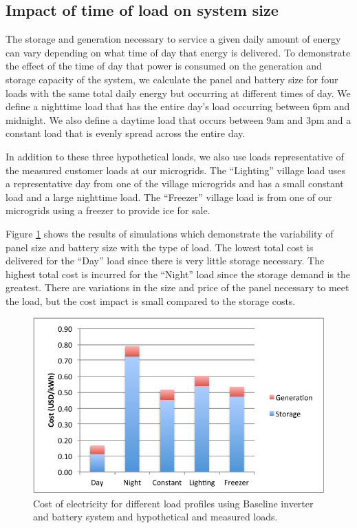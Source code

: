 \documentclass[conference]{IEEEtran}
\begin{document}
\subsection{Impact of time of load on system size}

The storage and generation necessary to service a given daily
amount of energy can vary depending on what time of day
that energy is delivered.
To demonstrate the effect of the time of day that power
is consumed on the generation and storage capacity of the system,
we calculate the panel and battery size for four loads with
the same total daily energy but occurring at different times of day.
We define a nighttime load that has the entire day's load 
occurring between 6pm and midnight.
We also define a daytime load that occurs between 9am and 3pm 
and a constant load that is evenly spread across the entire day.

In addition to these three hypothetical loads, we also use loads
representative of the measured customer loads at our microgrids. 
The ``Lighting'' village load uses a representative day from one of the
village microgrids and has a small constant load and a large
nighttime load.
The ``Freezer'' village load is from one of our microgrids using a freezer
to provide ice for sale.

Figure \ref{fig_baseline} 
shows the results of simulations
which demonstrate the variability of panel size and battery
size with the type of load.
The lowest total cost is delivered for the ``Day'' load
since there is very little storage necessary.
The highest total cost is incurred for the ``Night'' load since
the storage demand is the greatest.
There are variations in the size and price of the panel
necessary to meet the load, but the cost impact is small
compared to the storage costs.


\begin{figure}[]
\begin{center}
\includegraphics[width=\columnwidth]{figures/baseline.pdf}
\end{center}
\caption{Cost of electricity for different load profiles using Baseline 
inverter and battery system and hypothetical and measured loads.}
\label{fig_baseline}
\end{figure}
\end{document}
